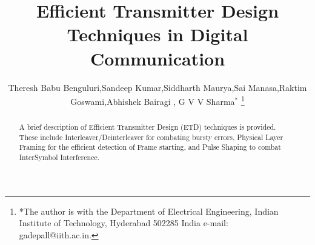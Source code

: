 \documentclass[journal,12pt,twocolumn]{IEEEtran}
\begin{document}


\let\StandardTheFigure\thefigure
\let\StandardTheTable\thetable





\def\putbox#1#2#3{\makebox[0in][l]{\makebox[#1][l]{}\raisebox{\baselineskip}[0in][0in]{\raisebox{#2}[0in][0in]{#3}}}}
     \def\rightbox#1{\makebox[0in][r]{#1}}
     \def\centbox#1{\makebox[0in]{#1}}
     \def\topbox#1{\raisebox{-\baselineskip}[0in][0in]{#1}}
     \def\midbox#1{\raisebox{-0.5\baselineskip}[0in][0in]{#1}}




\title{ 
Efficient Transmitter Design Techniques in Digital Communication
}



\author{Theresh Babu Benguluri,Sandeep Kumar,Siddharth Maurya,Sai Manasa,Raktim Goswami,Abhishek Bairagi , G V V Sharma$^{*}$%
\thanks{*The author is with the Department
of Electrical Engineering, Indian Institute of Technology, Hyderabad
502285 India e-mail:  gadepall@iith.ac.in.}
}


\maketitle

\tableofcontents

\bigskip
%
\begin{abstract}
A brief description of  Efficient Transmitter Design (ETD) techniques is provided. These include Interleaver/Deinterleaver for combating bursty errors, Physical Layer Framing for the efficient detection of Frame starting, and  Pulse Shaping to combat  InterSymbol Interference.
\end{abstract}

\end{document}
